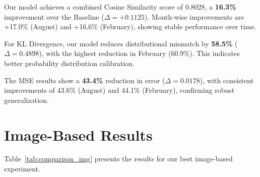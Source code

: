 \begin{table}[ht]
    \centering
    \caption{Performance comparison between Baseline and Our Model. The Baseline is the \textbf{CardiffNLP RoBERTa-Large}, which is used in a zero-shot setting. Higher values are better for $\uparrow$, and lower values are better for $\downarrow$. Bold values indicate combined scores.}
    \label{tab:comparison}
\end{table}

Our model achieves a combined Cosine Similarity score of 0.8028, a \textbf{16.3\%} improvement over the Baseline ($\Delta = +0.1125$). Month-wise improvements are +17.0\% (August) and +16.6\% (February), showing stable performance over time.
\newline

For KL Divergence, our model reduces distributional mismatch by \textbf{58.5\%} ($\Delta = 0.4898$), with the highest reduction in February (60.9\%). This indicates better probability distribution calibration.
\newline

The MSE results show a \textbf{43.4\%} reduction in error ($\Delta = 0.0178$), with consistent improvements of 43.6\% (August) and 44.1\% (February), confirming robust generalization.


\section{Image-Based Results}
\label{sec:image-results}

Table~\ref{tab:comparison_img} presents the results for our best image-based experiment.

